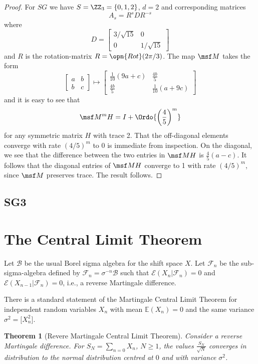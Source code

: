 \documentclass[11pt]{scrartcl}
\theoremstyle{plain} %
\newtheorem{thm}{Theorem}%
\theoremstyle{definition}
\begin{document}
\begin{proof}
For $SG$ we have $S=\ZZ_3=\{0,1,2\}$, $d=2$ and corresponding matrices 
$$ A_s = R^s D R^{-s} $$
where 
$$ D = \begin{bmatrix} 3/\sqrt{15} & 0 \\ 0 & 1/\sqrt{15} \end{bmatrix} $$
and $R$ is the rotation-matrix $R=\opn{Rot}(2\pi/3)$. The map $\msf M$
takes the form 
$$
\begin{bmatrix} a & b \\ b & c \end{bmatrix}
\mapsto
\begin{bmatrix}
 \frac{1}{10} (9 a+c) & \frac{4 b}{5} \\
 \frac{4 b}{5} & \frac{1}{10} (a+9 c)
\end{bmatrix}
$$
and it is easy to see that 
$$
\msf M^m H = I + \Ordo{\left(\frac {4}{5}\right)^m}
$$
for any symmetric matrix $H$ with trace 2. That the off-diagonal elements converge with rate $(4/5)^m$ to $0$ is immediate from inspection. On the diagonal, we see that the difference between the two entries in $\msf M H$ is $\frac45 (a-c)$. It follows that the diagonal entries of $\msf M H$ converge to 1 with rate $(4/5)^m$, since $\msf M$ preserves trace. The result follows.
\end{proof}
\subsection{SG3}

\section{The Central Limit Theorem}



Let $\mathcal B$ be the usual Borel sigma algebra for the shift space $X$.
Let $\mathcal F_n$ be the sub-sigma-algebra defined by $\mathcal F_n = \sigma^{-n}\mathcal B$ such that  $\mathcal E(X_n | \mathcal F_{n})=0$
and  $\mathcal E(X_{n-1} | \mathcal F_{n})=0$, i.e., a reverse Martingale difference.  

There is a standard statement of the Martingale Central Limit Theorem for independent random variables $X_n$ with mean $\mathbb E(X_n)=0$ and the same variance $\sigma^2 = \mathbb [X_n^2]$.    

\begin{thm}[Revere Martingale Central Limit Theorem]
Consider a   reverse Martingale difference.
For  $S_N = \sum_{n=0} X_n$, $N \geq 1$, 
the values $\frac{S_N}{\sqrt{N}}$ converges in distribution to the normal distribution centred at $0$ and with variance $\sigma^2$.
\end{thm}
\end{document}
